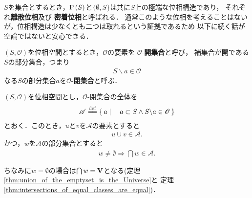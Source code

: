 	$S$を集合とするとき，$\operatorname*{P} \left(S\right)$と$\{\emptyset,S\}$は共に$S$上の極端な位相構造であり，
	それぞれ{\bf 離散位相}及び
	{\bf 密着位相}と呼ばれる．
	通常このような位相を考えることはないが，位相構造は少なくとも二つは取れるという証拠であるため
	以下に続く話が空論ではないと安心できる．
	
	\begin{screen}
		\begin{dfn}[開集合と閉集合]
			$(S,\mathscr{O})$を位相空間とするとき，$\mathscr{O}$の要素を
			$\mathscr{O}$-{\bf 開集合}と呼び，
			補集合が開である$S$の部分集合，つまり
			\begin{align}
				S \backslash a \in \mathscr{O}
			\end{align}
			なる$S$の部分集合$a$を$\mathscr{O}$-{\bf 閉集合}と呼ぶ．
		\end{dfn}
	\end{screen}
	
	\begin{screen}
		\begin{thm}[閉集合の全体は要素の対の合併と空でない部分集合の交叉で閉じる]
		\label{thm:union_of_two_closed_sets_is_closed_and_intersection_of_closed_sets_is_closed}
			$(S,\mathscr{O})$を位相空間とし，$\mathscr{O}$-閉集合の全体を
			\begin{align}
				\mathscr{A} \defeq \Set{a}{a \subset S \wedge S \backslash a \in \mathscr{O}}
			\end{align}
			とおく．このとき，$u$と$v$を$\mathscr{A}$の要素とすると
			\begin{align}
				u \cup v \in \mathscr{A}.
			\end{align}
			かつ，$w$を$\mathscr{A}$の部分集合とすると
			\begin{align}
				w \neq \emptyset \Longrightarrow \bigcap w \in \mathscr{A}.
			\end{align}
		\end{thm}
	\end{screen}
	
	ちなみに$w = \emptyset$の場合は$\bigcap w = \mathbf{V}$となる(定理\ref{thm:union_of_the_emptyset_is_the_Universe}と
	定理\ref{thm:intersections_of_equal_classes_are_equal})．
	
